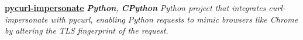 
\begin{cvparagraph}
    \begin{justify}
        \href{https://github.com/theol-git/pycurl-impersonate}{\textbf{pycurl-impersonate}} \textbf{\cdotp} \textit{\textbf{Python}, \textbf{CPython}} \textbf{\cdotp} \textit{Python project that integrates curl-impersonate with pycurl, enabling Python requests to mimic browsers like Chrome by altering the TLS fingerprint of the request.}
    \end{justify}
\end{cvparagraph}